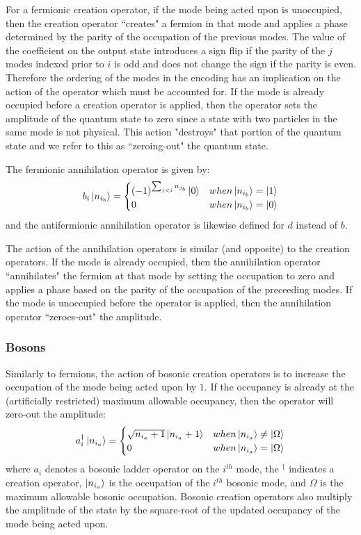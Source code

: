 For a fermionic creation operator, if the mode being acted upon is unoccupied, then the creation operator ``creates" a fermion in that mode and applies a phase determined by the parity of the occupation of the previous modes.
The value of the coefficient on the output state introduces a sign flip if the parity of the $j$ modes indexed prior to $i$ is odd and does not change the sign if the parity is even. 
Therefore the ordering of the modes in the encoding has an implication on the action of the operator which must be accounted for.
If the mode is already occupied before a creation operator is applied, then the operator sets the amplitude of the quantum state to zero since a state with two particles in the same mode is not physical.
This action "destroys" that portion of the quantum state and we refer to this as ``zeroing-out" the quantum state. 

The fermionic annihilation operator is given by:
\begin{equation}
    \label{eq:fermionic-annihilation}
    b_i \ket{n_{i_b}} = 
    \begin{cases} 
        (-1)^{\sum_{j < i} n_{j_b}} \ket{0}  & when \ket{n_{i_b}} = \ket{1} \\
        0 & when \ket{n_{i_b}} = \ket{0}
    \end{cases}
\end{equation}
and the antifermionic annihilation operator is likewise defined for $d$ instead of $b$.

The action of the annihilation operators is similar (and opposite) to the creation operators.
If the mode is already occupied, then the annihilation operator ``annihilates" the fermion at that mode by setting the occupation to zero and applies a phase based on the parity of the occupation of the preceeding modes.
If the mode is unoccupied before the operator is applied, then the annihilation operator ``zeroes-out" the amplitude.

\subsubsection{Bosons}

Similarly to fermions, the action of bosonic creation operators is to increase the occupation of the mode being acted upon by $1$.
If the occupancy is already at the (artificially restricted) maximum allowable occupancy, then the operator will zero-out the amplitude:
\begin{equation}
    \label{eq:bosonic-creation}
    a_i^\dagger \ket{n_{i_a}} = 
    \begin{cases} 
        \sqrt{n_{i_a} + 1} \ket{n_{i_a} + 1}  & when \ket{n_{i_a}} \neq \ket{\Omega} \\
        0 & when \ket{n_{i_a}} = \ket{\Omega}
    \end{cases}
\end{equation}
where $a_i$ denotes a bosonic ladder operator on the $i^{th}$ mode, the $^\dagger$ indicates a creation operator, $\ket{n_{i_a}}$ is the occupation of the $i^{th}$ bosonic mode, and $\Omega$ is the maximum allowable bosonic occupation.
Bosonic creation operators also multiply the amplitude of the state by the square-root of the updated occupancy of the mode being acted upon.

